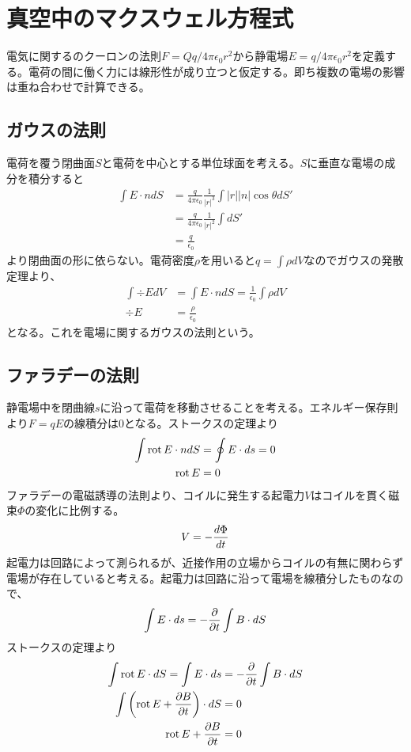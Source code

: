 \section{真空中のマクスウェル方程式}

電気に関するのクーロンの法則$F = Qq / 4\pi\epsilon_0r^2$から静電場$E = q / 4\pi\epsilon_0r^2$を定義する。電荷の間に働く力には線形性が成り立つと仮定する。即ち複数の電場の影響は重ね合わせで計算できる。

\subsection{ガウスの法則}
    電荷を覆う閉曲面$S$と電荷を中心とする単位球面を考える。$S$に垂直な電場の成分を積分すると
    \begin{align*}
        \int E \cdot n dS
            &= \frac{q}{4\pi\epsilon_0}\frac{1}{|r|^3}\int |r||n|\cos\theta dS'\\
            &= \frac{q}{4\pi\epsilon_0}\frac{1}{|r|^2}\int dS'\\
            &= \frac{q}{\epsilon_0}
    \end{align*}
    より閉曲面の形に依らない。電荷密度$\rho$を用いると$q = \int \rho dV$なのでガウスの発散定理より、
    \begin{align*}
        \int \div E dV &= \int E \cdot n dS = \frac{1}{\epsilon_0} \int \rho dV\\
        \div E &= \frac{\rho}{\epsilon_0}
    \end{align*}
    となる。これを電場に関するガウスの法則という。

\subsection{ファラデーの法則}
    静電場中を閉曲線$s$に沿って電荷を移動させることを考える。エネルギー保存則より$F = qE$の線積分は0となる。ストークスの定理より
    \begin{align*}
        \int \rot E \cdot ndS &= \oint E \cdot ds = 0\\
        \rot E &= 0
    \end{align*}
    ファラデーの電磁誘導の法則より、コイルに発生する起電力$V$はコイルを貫く磁束$\Phi$の変化に比例する。
        \[V = -\de[\Phi]{t}\]
    起電力は回路によって測られるが、近接作用の立場からコイルの有無に関わらず電場が存在していると考える。起電力は回路に沿って電場を線積分したものなので、
        \[\int E \cdot ds = -\pd{t} \int B \cdot dS\]
    ストークスの定理より
    \begin{align*}
        \int \rot E \cdot dS = \int E \cdot ds &= -\pd{t} \int B \cdot dS\\
        \int \left(\rot E + \pd[B]{t}\right) \cdot dS &= 0\\
        \rot E + \pd[B]{t} &= 0
    \end{align*}

